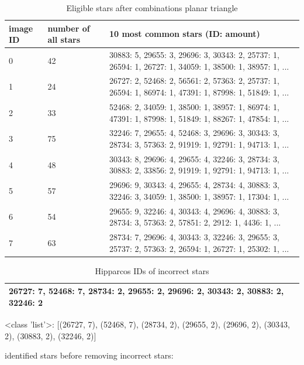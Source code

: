 \documentclass[12pt,a4paper,oneside]{article}
\begin{document}
\renewcommand{\arraystretch}{1.5}
\begin{table}[!htbp]
\centering
\begin{tabular}{|p{1.5cm}|p{1.5cm}|p{7cm}|}
\hline 
image ID & number of all stars & 10 most common stars (ID: amount)\\ 
\hline 
0 & 42 &  30883: 5, 29655: 3, 29696: 3, 30343: 2, 25737: 1, 26594: 1, 26727: 1, 34059: 1, 38500: 1, 38957: 1, ... \\
\hline 
1 & 24 &  26727: 2, 52468: 2, 56561: 2, 57363: 2, 25737: 1, 26594: 1, 86974: 1, 47391: 1, 87998: 1, 51849: 1, ... \\
\hline 
2 & 33 &  52468: 2, 34059: 1, 38500: 1, 38957: 1, 86974: 1, 47391: 1, 87998: 1, 51849: 1, 88267: 1, 47854: 1, ... \\
\hline 
3 & 75 &  32246: 7, 29655: 4, 52468: 3, 29696: 3, 30343: 3, 28734: 3, 57363: 2, 91919: 1, 92791: 1, 94713: 1, ... \\
\hline 
4 & 48 &  30343: 8, 29696: 4, 29655: 4, 32246: 3, 28734: 3, 30883: 2, 33856: 2, 91919: 1, 92791: 1, 94713: 1, ... \\
\hline 
5 & 57 &  29696: 9, 30343: 4, 29655: 4, 28734: 4, 30883: 3, 32246: 3, 34059: 1, 38500: 1, 38957: 1, 17304: 1, ... \\
\hline 
6 & 54 &  29655: 9, 32246: 4, 30343: 4, 29696: 4, 30883: 3, 28734: 3, 57363: 2, 57851: 2, 2912: 1, 4436: 1, ... \\
\hline 
7 & 63 &  28734: 7, 29696: 4, 30343: 3, 32246: 3, 29655: 3, 25737: 2, 57363: 2, 26594: 1, 26727: 1, 25302: 1, ... \\
\hline 
\end{tabular}
\caption{Eligible stars after combinations planar triangle}
\label{tab:example_2}
\end{table}




\renewcommand{\arraystretch}{1.5}
\begin{table}[!htbp]
\centering
\begin{tabular}{|p{7cm}|}
\hline 
26727: 7, 52468: 7, 28734: 2, 29655: 2, 29696: 2, 30343: 2, 30883: 2, 32246: 2 \\
\hline 
\end{tabular}
\caption{Hipparcos IDs of incorrect stars}
\label{tab:example_3}
\end{table}

<class 'list'>: [(26727, 7), (52468, 7), (28734, 2), (29655, 2), (29696, 2), (30343, 2), (30883, 2), (32246, 2)]

identified stars before removing incorrect stars:
\end{document}
